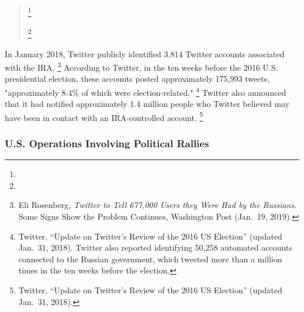 \begin{quote}

\footnote{}

\footnote{}

\end{quote}

In January 2018, Twitter publicly identified 3,814 Twitter accounts associated with the IRA\null.%
\footnote{Eli Rosenberg, \textit{Twitter to Tell 677,000 Users they Were Had by the Russians}.
Some Signs Show the Problem Continues, Washington Post (Jan.~19, 2019).}
According to Twitter, in the ten weeks before the 2016 U.S. presidential election, these accounts posted approximately 175,993 tweets, "approximately 8.4\% of which were election-related."%
\footnote{Twitter, “Update on Twitter's Review of the 2016 US Election” (updated Jan.~31, 2018).
Twitter also reported identifying 50,258 automated accounts connected to the Russian government, which tweeted more than a million times in the ten weeks before the election.}
Twitter also announced that it had notified approximately 1.4 million people who Twitter believed may have been in contact with an IRA-controlled account.%
\footnote{Twitter, “Update on Twitter's Review of the 2016 US Election” (updated Jan.~31, 2018).}

\subsubsection{U.S. Operations Involving Political Rallies}

